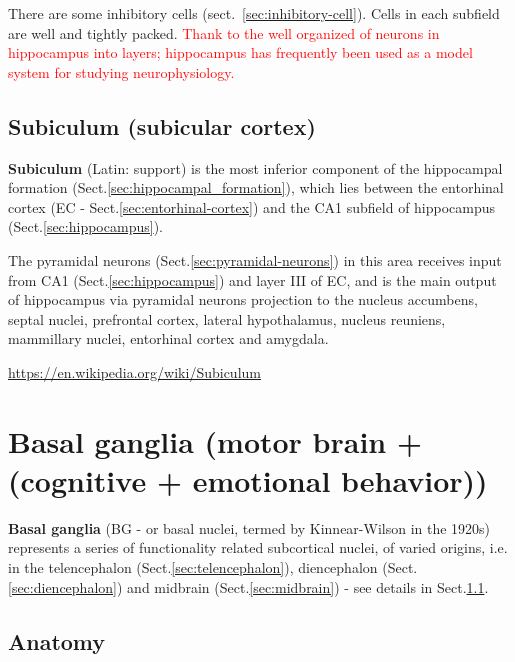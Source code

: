 There are some inhibitory cells (sect.~\ref{sec:inhibitory-cell}). Cells in
each subfield are well and tightly packed.  \textcolor{red}{Thank to the well
organized of neurons in hippocampus into layers; hippocampus has frequently been
used as a model system for studying neurophysiology.}



\subsection{Subiculum (subicular cortex)}
\label{sec:subiculum}

{\bf Subiculum} (Latin: support) is the most inferior component of the
hippocampal formation (Sect.\ref{sec:hippocampal_formation}), which lies between
the entorhinal cortex (EC - Sect.\ref{sec:entorhinal-cortex}) and the CA1
subfield of hippocampus (Sect.\ref{sec:hippocampus}).

The pyramidal neurons (Sect.\ref{sec:pyramidal-neurons}) in this area receives
input from CA1 (Sect.\ref{sec:hippocampus}) and layer III of EC, and is the main
output of hippocampus via pyramidal neurons projection to the nucleus accumbens,
septal nuclei, prefrontal cortex, lateral hypothalamus, nucleus reuniens,
mammillary nuclei, entorhinal cortex and amygdala.

\url{https://en.wikipedia.org/wiki/Subiculum}

  
\section{Basal ganglia (motor brain + (cognitive + emotional behavior))}
\label{sec:basal-ganglia}

{\bf Basal ganglia} (BG - or basal nuclei, termed by Kinnear-Wilson in the
1920s) represents a series of functionality related subcortical nuclei, of
varied origins, i.e. in the telencephalon (Sect.\ref{sec:telencephalon}),
diencephalon (Sect.\ref{sec:diencephalon}) and midbrain
(Sect.\ref{sec:midbrain}) - see details in Sect.\ref{sec:basal-ganglia-anatomy}.


\subsection{Anatomy}
\label{sec:basal-ganglia-anatomy}



